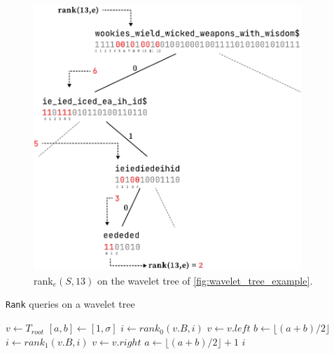 \begin{figure}[h]
    \centering
    \includegraphics[width=0.9\textwidth]{assets/WT_rank_example.pdf}
    \caption{\textsf{rank}$_e(S,13)$ on the wavelet tree of \autoref{fig:wavelet_tree_example}.}
    \label{fig:rank_example_wt}
\end{figure}


\begin{algorithm}[h!]
    \caption{\texttt{Rank} queries on a wavelet tree}\label{alg:rank_wt}
    \begin{algorithmic}
        \State $v \gets T_{root}$ 
        \State $[a,b] \gets [1,\sigma]$
        \State $i \gets rank_0(v.B,i)$
        \State $v \gets v.left$ 
        \State $b \gets \lfloor (a+b)/2 \rfloor$
        \Else
        \State $i \gets rank_1(v.B,i)$
        \State $v \gets v.right$ 
        \State $a \gets \lfloor (a+b)/2 \rfloor +1$
        \EndIf
        \EndWhile
        \State \Return $i$
        \EndFunction
    \end{algorithmic}
\end{algorithm}

